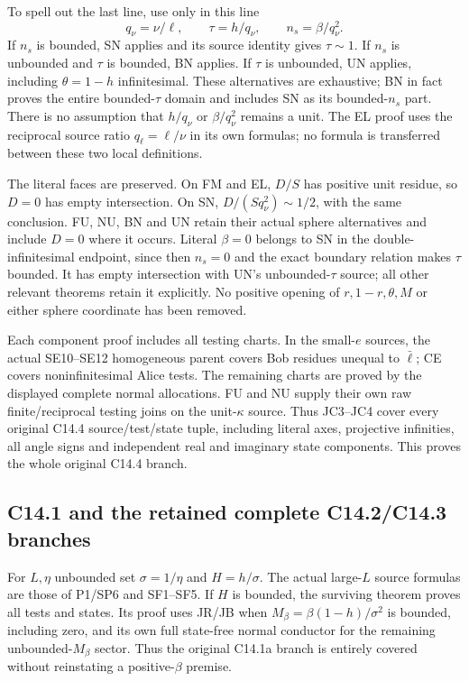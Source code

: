 To spell out the last line, use only in this line
\[
 q_\nu=\nu/\ell,\qquad \tau=h/q_\nu,
 \qquad n_s=\beta/q_\nu^2.                         \tag{JC4}
\]
If $n_s$ is bounded, SN applies and its source identity gives
$\tau\sim1$.  If $n_s$ is unbounded and $\tau$ is bounded,
BN applies.  If $\tau$ is unbounded, UN applies, including
$\theta=1-h$ infinitesimal.  These alternatives are exhaustive;
BN in fact proves the entire bounded-$\tau$ domain and includes
SN as its bounded-$n_s$ part.  There is no assumption that
$h/q_\nu$ or $\beta/q_\nu^2$ remains a unit.  The EL proof uses
the reciprocal source ratio $q_\ell=\ell/\nu$ in its own formulas;
no formula is transferred between these two local definitions.

The literal faces are preserved.  On FM and EL, $D/S$ has positive
unit residue, so $D=0$ has empty intersection.  On SN,
$D/(Sq_\nu^2)\sim1/2$, with the same conclusion.  FU, NU, BN and
UN retain their actual sphere alternatives and include $D=0$
where it occurs.  Literal $\beta=0$ belongs to SN in the
double-infinitesimal endpoint, since then $n_s=0$ and the exact
boundary relation makes $\tau$ bounded.  It has empty intersection
with UN's unbounded-$\tau$ source; all other relevant theorems
retain it explicitly.  No positive opening of $r,1-r,\theta,M$
or either sphere coordinate has been removed.

Each component proof includes all testing charts.  In the small-$e$
sources, the actual SE10--SE12 homogeneous parent covers Bob residues
unequal to $\bar\ell$; CE covers noninfinitesimal Alice tests.
The remaining charts are proved by the displayed complete normal
allocations.  FU and NU supply their own raw finite/reciprocal
testing joins on the unit-$\kappa$ source.  Thus JC3--JC4 cover
every original C14.4 source/test/state tuple, including literal
axes, projective infinities, all angle signs and independent
real and imaginary state components.  This proves the whole
original C14.4 branch.

\subsection{C14.1 and the retained complete C14.2/C14.3 branches}
For $L,\eta$ unbounded set $\sigma=1/\eta$ and $H=h/\sigma$.
The actual large-$L$ source formulas are those of P1/SP6 and SF1--SF5.
If $H$ is bounded, the surviving
 theorem proves
all tests and states.  Its proof uses JR/JB when
$M_\beta=\beta(1-h)/\sigma^2$ is bounded, including zero,
and its own full state-free normal conductor for the remaining
unbounded-$M_\beta$ sector.  Thus the original C14.1a branch is
entirely covered without reinstating a positive-$\beta$ premise.

